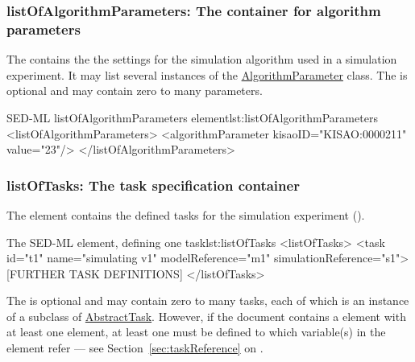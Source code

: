 \subsubsection{listOfAlgorithmParameters: The container for algorithm parameters}
\label{sec:listOfAlgorithmParameters}
The  contains the the settings for the simulation algorithm used in a simulation experiment. It may list several instances of the \hyperref[class:algorithmParameter]{AlgorithmParameter} class. The  is optional and may contain zero to many parameters.

\begin{myXmlLst}{SED-ML listOfAlgorithmParameters element}{lst:listOfAlgorithmParameters}
<listOfAlgorithmParameters>
	<algorithmParameter kisaoID="KISAO:0000211" value="23"/> 
</listOfAlgorithmParameters>
\end{myXmlLst}

 
\subsubsection{listOfTasks: The task specification container}
\label{sec:listOfTasks}
The  element contains the defined tasks for the simulation experiment ().



\begin{myXmlLst}{The SED-ML  element, defining one task}{lst:listOfTasks}
<listOfTasks>
	<task id="t1" name="simulating v1" modelReference="m1" simulationReference="s1">
	[FURTHER TASK DEFINITIONS]
</listOfTasks>
\end{myXmlLst}

The  is optional and may contain zero to many tasks, each of which is an instance of a subclass of \hyperref[class:abstractTask]{AbstractTask}. However, if the \currentLV document contains a  element with at least one  element, at least one  must be defined to which variable(s) in the  element refer --- see Section~\ref{sec:taskReference} on .


